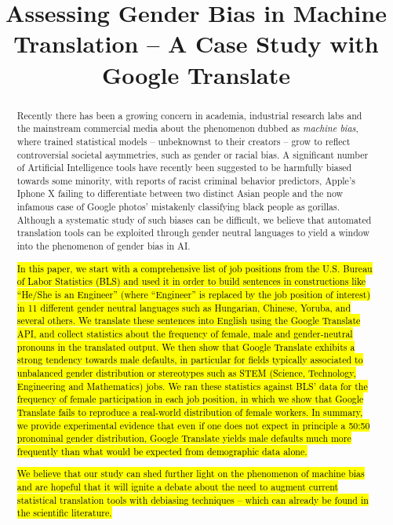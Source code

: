\documentclass[fleqn,10pt]{article}
\title{Assessing Gender Bias in Machine Translation -- A Case Study with Google Translate}
\begin{document}
\newif\ifchanged
\changedtrue
{}
\DeclareRobustCommand{\changess}[1]{\ifchanged{\hl{#1}}\else{#1 }\fi}
\DeclareRobustCommand{\changess}[1]{\ifthenelse{\boolean{mark}}{\hl{#1}}{#1}}

\maketitle

\begin{abstract}
Recently there has been a growing concern in academia, industrial research labs and the mainstream commercial media about the phenomenon dubbed as \emph{machine bias}, where trained statistical models -- unbeknownst to their creators -- grow to reflect controversial societal asymmetries, such as gender or racial bias. A significant number of Artificial Intelligence tools have recently been suggested to be harmfully biased towards some minority, with reports of racist criminal behavior predictors, Apple's Iphone X failing to differentiate between two distinct Asian people and the now infamous case of Google photos' mistakenly classifying black people as gorillas. Although a systematic study of such biases can be difficult, we believe that automated translation tools can be exploited through gender neutral languages to yield a window into the phenomenon of gender bias in AI.

\changess{In this paper,  we start with a comprehensive list of job positions from the U.S. Bureau of Labor Statistics (BLS) and used it in order to build sentences in constructions like ``He/She is an Engineer'' (where ``Engineer'' is replaced by the job position of interest) in 11 different gender neutral languages such as Hungarian, Chinese, Yoruba, and several others. We translate these sentences into English using the Google Translate API, and collect statistics about the frequency of female, male and gender-neutral pronouns in the translated output. We then show that Google Translate exhibits a strong tendency towards male defaults,  in particular for fields typically associated to unbalanced gender distribution or  stereotypes such as STEM (Science, Technology, Engineering and Mathematics) jobs. We ran these statistics against BLS' data for the frequency of female participation in each job position, in which we show that Google Translate fails to reproduce a real-world distribution of female workers. In summary, we provide experimental evidence that even if one does not expect in principle a 50:50 pronominal gender distribution, Google Translate yields male defaults much more frequently than what would be expected from demographic data alone.}

\changess{We believe that our study can shed further light on the phenomenon of machine bias and are hopeful that it will ignite a debate about the need to augment current statistical translation tools with debiasing techniques -- which can already be found in the scientific literature.}
\end{abstract}
\end{document}
